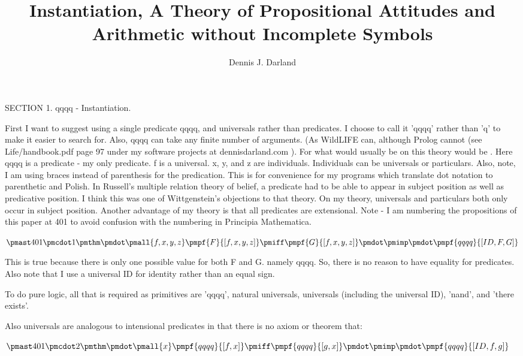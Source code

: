 \documentclass[12pt]{article}
\begin{document}
\title{Instantiation, A Theory of Propositional Attitudes and Arithmetic without Incomplete Symbols}
\author{Dennis J. Darland}
\maketitle

SECTION 1. qqqq - Instantiation.

First I want to suggest using a single predicate qqqq, and universals rather than predicates. I choose to call it 'qqqq' rather than 'q' to make it easier to
search for. Also, qqqq can take any finite number of arguments. (As WildLIFE can, although Prolog cannot (see Life/handbook.pdf page 97 under my software projects at dennisdarland.com ). For what would usually be  on this theory would be  . Here qqqq is a predicate - my only predicate. f is a universal. x, y, and z are individuals. Individuals can be universals or particulars. Also, note, I am using braces instead of parenthesis for the predication. This is for convenience for my programs which translate dot notation to parenthetic and Polish. In Russell's multiple relation theory of belief, a predicate had to be able to appear in subject position as well as predicative position. I think this was one of Wittgenstein's objections to that theory. On my theory, universals and particulars both only occur in subject position. Another advantage of my theory is that all predicates are extensional. Note - I am numbering the propositions of this paper at 401 to avoid confusion with the numbering in Principia Mathematica.

$\pmast 401 \pmcdot 1 \pmthm \pmdot \pmall{f, x, y, z} \pmpf{F}{[f,x,y,z]} \pmiff \pmpf{G}{[f,x,y,z]} \pmdot \pmimp \pmdot \pmpf{qqqq}{[ID,F,G]} $

This is true because there is only one possible value for both F and G. namely qqqq. So, there is no reason to have equality for predicates. Also note that I use a universal ID for identity rather than an equal sign.

To do pure logic, all that is required as primitives are 'qqqq', natural universals, universals (including the universal ID), 'nand', and 'there exists'.  

Also universals are analogous to intensional predicates in that there is no axiom or theorem that:

$\pmast 401 \pmcdot 2 \pmthm \pmdot \pmall{x} \pmpf{qqqq}{[f, x]} \pmiff \pmpf{qqqq}{[g, x]} \pmdot \pmimp \pmdot \pmpf{qqqq}{[ID, f, g]} $
\end{document}
